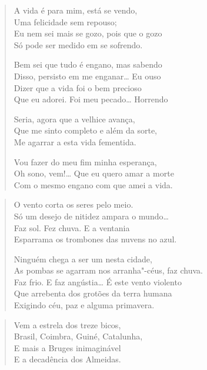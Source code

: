 {

\begin{verse}
A vida é para mim, está se vendo,\\
Uma felicidade sem repouso;\\
Eu nem sei mais se gozo, pois que o gozo\\
Só pode ser medido em se sofrendo.

Bem sei que tudo é engano, mas sabendo\\
Disso, persisto em me enganar\ldots{} Eu ouso\\
Dizer que a vida foi o bem precioso\\
Que eu adorei. Foi meu pecado\ldots{} Horrendo

Seria, agora que a velhice avança,\\
Que me sinto completo e além da sorte,\\
Me agarrar a esta vida fementida.

Vou fazer do meu fim minha esperança,\\
Oh sono, vem!\ldots{} Que eu quero amar a morte\\
Com o mesmo engano com que amei a vida.
\end{verse}


\begin{verse}
O vento corta os seres pelo meio.\\
Só um desejo de nitidez ampara o mundo\ldots{}\\
Faz sol. Fez chuva. E a ventania\\
Esparrama os trombones das nuvens no azul.

Ninguém chega a ser um nesta cidade,\\
As pombas se agarram nos arranha"-céus, faz chuva.\\
Faz frio. E faz angústia\ldots{} É este vento violento\\
Que arrebenta dos grotões da terra humana\\
Exigindo céu, paz e alguma primavera.
\end{verse}


\begin{verse}
Vem a estrela dos treze bicos,\\
Brasil, Coimbra, Guiné, Catalunha,\\
E mais a Bruges inimaginável\\
E a decadência dos Almeidas.


\end{verse}}

